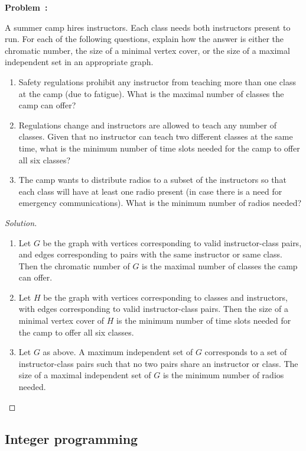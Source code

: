 \documentclass[12pt]{article}
\newcounter{problem}
\newenvironment{problem}[1][Problem]{%
	\refstepcounter{problem}%
	\noindent\textbf{\color{magenta}#1~\theproblem: }%
}{}
\newenvironment{solution}
    {\renewcommand{\qedsymbol}{}\begin{proof}[Solution]}
    {\end{proof}}
\begin{document}
\begin{problem}
A summer camp hires instructors. Each class needs both instructors present to run. For each of the following questions, explain how the answer is either the chromatic number, the size of a minimal vertex cover, or the size of a maximal independent set in an appropriate graph.

\begin{enumerate}
	\item Safety regulations prohibit any instructor from teaching more than one class at the camp (due to fatigue). What is the maximal number of classes the camp can offer?
	\item Regulations change and instructors are allowed to teach any number of classes. Given that no instructor can teach two different classes at the same time, what is the minimum number of time slots needed for the camp to offer all six classes?
	\item The camp wants to distribute radios to a subset of the instructors so that each class will have at least one radio present (in case there is a need for emergency communications). What is the minimum number of radios needed?
\end{enumerate}
\end{problem}

\begin{solution}
	\begin{enumerate}
		\item Let $G$ be the graph with vertices corresponding to valid instructor-class pairs, and edges corresponding to pairs with the same instructor or same class. Then the chromatic number of $G$ is the maximal number of classes the camp can offer.
		\item Let $H$ be the graph with vertices corresponding to classes and instructors, with edges corresponding to valid instructor-class pairs. Then the size of a minimal vertex cover of $H$ is the minimum number of time slots needed for the camp to offer all six classes.
		\item Let $G$ as above. A maximum independent set of $G$ corresponds to a set of instructor-class pairs such that no two pairs share an instructor or class. The size of a maximal independent set of $G$ is the minimum number of radios needed.
	\end{enumerate}
\end{solution}
\subsection{Integer programming}
\end{document}
